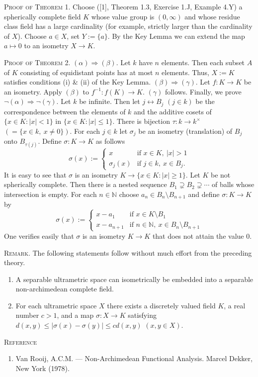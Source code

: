 \documentclass[11pt,a4paper,twoside]{article}
\newcommand{\proofhead}[1]{\par\medskip\noindent\textsc{#1}\quad}
\begin{document}
\proofhead{Proof of Theorem 1.} Choose ([1], Theorem 1.3, Exercise 1.J, Example 4.Y) a spherically complete field $K$ whose value group is $(0,\infty)$ and whose residue class field has a large cardinality (for example, strictly larger than the cardinality of $X$). Choose $a\in X$, set $Y:=\{a\}$. By the Key Lemma we can extend the map $a\mapsto0$ to an isometry $X\to K$.

\proofhead{Proof of Theorem 2.} $(\alpha)\Rightarrow(\beta)$. Let $k$ have $n$ elements. Then each subset $A$
\newpage
\noindent of $K$ consisting of equidistant points has at most $n$ elements. Thus, $X:=K$ satisfies conditions (i) \& (ii) of the Key Lemma. $(\beta)\Rightarrow(\gamma)$. Let $f\colon K\to K$ be an isometry. Apply $(\beta)$ to $f^{-1}\colon f(K)\to K$. $(\gamma)$ follows. Finally, we prove $\neg(\alpha)\Rightarrow\neg(\gamma)$. Let $k$ be infinite. Then let $j\leftrightarrow B_j$ $(j\in k)$ be the correspondence between the elements of $k$ and the additive cosets of $\{x\in K:|x|<1\}$ in $\{x\in K:|x|\leq1\}$. There is bijection $\tau\colon k\to k^{\times}$ $(=\{x\in k,\ x\ne0\})$. For each $j\in k$ let $\sigma_j$ be an isometry (translation) of $B_j$ onto $B_{\tau(j)}$. Define $\sigma\colon K\to K$ as follows
\[
\sigma(x):=\begin{cases}
x&\text{if }x\in K,\ |x|>1\\[8pt]
\sigma_j(x)&\text{if }j\in k,\ x\in B_j.
\end{cases}
\]
It is easy to see that $\sigma$ is an isometry $K\to\{x\in K:|x|\geq1\}$. Let $K$ be not spherically complete. Then there is a nested sequence $B_1\supsetneq B_2\supsetneq\cdots$ of balls whose intersection is empty. For each $n\in\mathbb N$ choose $a_n\in B_n\setminus B_{n+1}$ and define $\sigma\colon K\to K$ by
\[
\sigma(x):=\begin{cases}
x-a_1&\text{if }x\in K\setminus B_1\\[8pt]
x-a_{n+1}&\text{if }n\in\mathbb N,\ x\in B_n\setminus B_{n+1}
\end{cases}
\]
One verifies easily that $\sigma$ is an isometry $K\to K$ that does not attain the value 0.

\proofhead{Remark.} The following statements follow without much effort from the preceding theory.
\begin{enumerate}[label=\arabic*.,leftmargin=1.5em,itemsep=3pt]
\item A separable ultrametric space can isometrically be embedded into a separable non-archi\-medean complete field.
\item For each ultrametric space $X$ there exists a discretely valued field $K$, a real number $c>1$, and a map $\sigma\colon X\to K$ satisfying $d(x,y)\leq|\sigma(x)-\sigma(y)|\leq cd(x,y)$ $(x,y\in X)$.
\end{enumerate}
\bigskip\noindent\textsc{Reference}
\begin{enumerate}[label=\arabic*.,leftmargin=1.5em]
\item Van Rooij, A.C.M. --- Non-Archimedean Functional Analysis. Marcel Dekker, New York (1978).
\end{enumerate}
\end{document}
